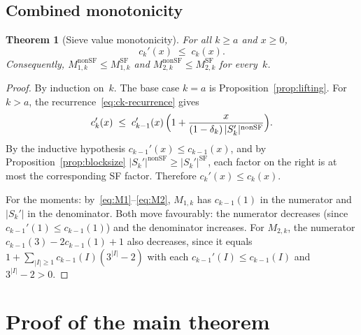 \documentclass[11pt]{amsart}
\newtheorem{theorem}{Theorem}[section]
\theoremstyle{definition}
\theoremstyle{remark}
\begin{document}
\subsection{Combined monotonicity}

\begin{theorem}[Sieve value monotonicity]\label{thm:monotonicity}
For all $k \ge a$ and $x \ge 0$,
\begin{equation}\label{eq:ck-mono}
  c_k'(x) \;\le\; c_k(x).
\end{equation}
Consequently, $M_{1,k}^{\mathrm{nonSF}} \le M_{1,k}^{\mathrm{SF}}$ and
$M_{2,k}^{\mathrm{nonSF}} \le M_{2,k}^{\mathrm{SF}}$ for every~$k$.
\end{theorem}

\begin{proof}
By induction on~$k$. The base case $k = a$ is
Proposition~\ref{prop:lifting}. For $k > a$, the
recurrence~\eqref{eq:ck-recurrence} gives
\[
  c_k'(x)
  \;\le\;
  c_{k-1}'(x)\,\Bigl(1 + \frac{x}{(1-\delta_k)\,|S_k'|^{\mathrm{nonSF}}}\Bigr).
\]
By the inductive hypothesis $c_{k-1}'(x) \le c_{k-1}(x)$,
and by Proposition~\ref{prop:blocksize}
$|S_k'|^{\mathrm{nonSF}} \ge |S_k'|^{\mathrm{SF}}$,
each factor on the right is at most the corresponding SF factor.
Therefore $c_k'(x) \le c_k(x)$.

For the moments: by~\eqref{eq:M1}--\eqref{eq:M2},
$M_{1,k}$ has $c_{k-1}(1)$ in the numerator and $|S_k'|$ in the
denominator. Both move favourably: the numerator decreases
(since $c_{k-1}'(1) \le c_{k-1}(1)$) and the denominator increases.
For $M_{2,k}$, the numerator $c_{k-1}(3) - 2c_{k-1}(1) + 1$ also
decreases, since it equals
$1 + \sum_{|I| \ge 1} c_{k-1}(I)(3^{|I|} - 2)$ with each
$c_{k-1}'(I) \le c_{k-1}(I)$ and $3^{|I|} - 2 > 0$.
\end{proof}

\section{Proof of the main theorem}
\end{document}
